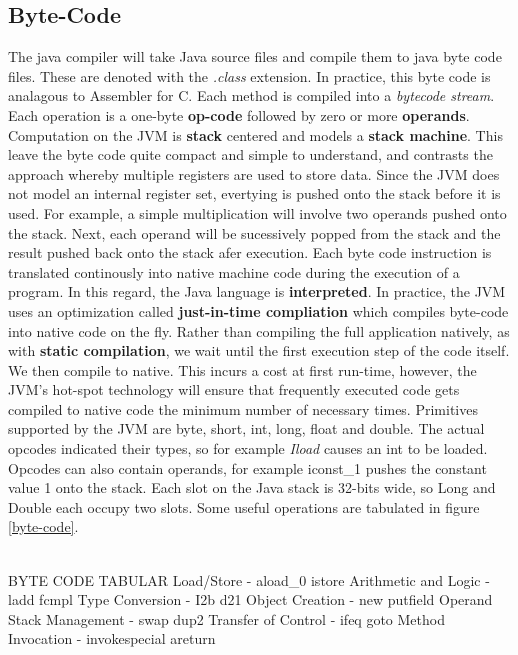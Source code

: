 \documentclass[10pt,a4paper]{article}
\begin{document}
\subsection{Byte-Code}
The java compiler will take Java source files and compile them to java byte code files. These are denoted with the {\it .class} extension. In practice, this byte code is analagous to Assembler for C. Each method is compiled into a {\it bytecode stream}. Each operation is a one-byte {\bf op-code} followed by zero or more {\bf operands}. Computation on the JVM is {\bf stack} centered and models a {\bf stack machine}. This leave the byte code quite compact and simple to understand, and contrasts the approach whereby multiple registers are used to store data. Since the JVM does not model an internal register set, evertying is pushed onto the stack before it is used. For example, a simple multiplication will involve two operands pushed onto the stack. Next, each operand will be sucessively popped from the stack and the result pushed back onto the stack afer execution. 
\newline\newline
Each byte code instruction is translated continously into native machine code during the execution of a program. In this regard, the Java language is {\bf interpreted}. In practice, the JVM uses an optimization called {\bf just-in-time compliation} which compiles byte-code into native code on the fly. Rather than compiling the full application natively, as with {\bf static compilation}, we wait until the first execution step of the code itself. We then compile to native. This incurs a cost at first run-time, however, the JVM's hot-spot technology will ensure that frequently executed code gets compiled to native code the minimum number of necessary times. 
\newline\newline
Primitives supported by the JVM are byte, short, int, long, float and double. The actual opcodes indicated their types, so for example {\it Iload} causes an int to be loaded. Opcodes can also contain operands, for example iconst_1 pushes the constant value 1 onto the stack. Each slot on the Java stack is 32-bits wide, so Long and Double each occupy two slots. Some useful operations are tabulated in figure \ref{byte-code}.

\\ BYTE CODE TABULAR
Load/Store - aload_0 istore
Arithmetic and Logic - ladd fcmpl
Type Conversion - I2b d21
Object Creation - new putfield
Operand Stack Management - swap dup2
Transfer of Control - ifeq goto
Method Invocation - invokespecial areturn
\end{document}
